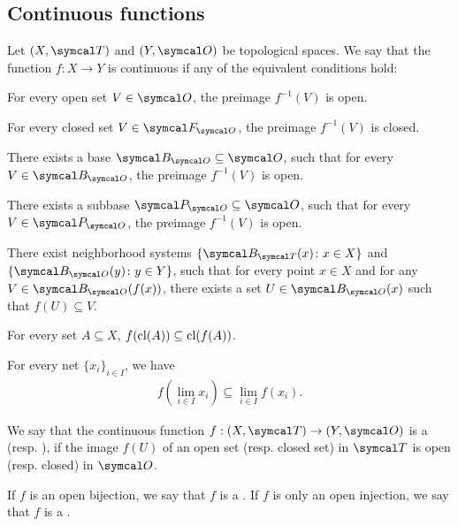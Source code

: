 \subsection{Continuous functions}\label{sec:continuous_functions}

\begin{definition}\label{def:continuous_function}
  Let \( (X, \Cal{T}) \) and \( (Y, \Cal{O}) \) be topological spaces. We say that the function \( f: X \to Y \) is continuous if any of the equivalent conditions hold:
  \begin{defenum}
    \item\label{def:continuous_function/direct} For every open set \( V \in \Cal{O} \), the preimage \( f^{-1}(V) \) is open.
    \item\label{def:continuous_function/closed} For every closed set \( V \in \Cal{F}_{\Cal{O}} \), the preimage \( f^{-1}(V) \) is closed.
    \item\label{def:continuous_function/base} There exists a base \( \Cal{B}_{\Cal{O}} \subseteq \Cal{O} \), such that for every \( V \in \Cal{B}_{\Cal{O}} \), the preimage \( f^{-1}(V) \) is open.
    \item\label{def:continuous_function/subbase} There exists a subbase \( \Cal{P}_{\Cal{O}} \subseteq \Cal{O} \), such that for every \( V \in \Cal{P}_{\Cal{O}} \), the preimage \( f^{-1}(V) \) is open.
    \item\label{def:continuous_function/local_base} There exist neighborhood systems \( \{ \Cal{B}_{\Cal{T}}(x) \colon x \in X \} \) and \( \{ \Cal{B}_{\Cal{O}}(y) \colon y \in Y \} \), such that for every point \( x \in X \) and for any \( V \in \Cal{B}_{\Cal{O}}(f(x)) \), there exists a set \( U \in \Cal{B}_{\Cal{O}}(x) \) such that \( f(U) \subseteq V \).
    \item\label{def:continuous_function/closure} For every set \( A \subseteq X \), \( f(\operatorname{cl}(A)) \subseteq \operatorname{cl}(f(A)) \).
    \item\label{def:continuous_function/limits} For every net \( \{ x_i \}_{i \in I} \), we have
    \begin{align*}
      f\left(\lim_{i \in I} x_i \right) \subseteq \lim_{i \in I} f(x_i).
    \end{align*}
  \end{defenum}
\end{definition}

\begin{definition}\label{def:homeomorphism}
  We say that the continuous function \( f: (X, \Cal{T}) \to (Y, \Cal{O}) \) is a  (resp. ), if the image \( f(U) \) of an open set (resp. closed set) in \( \Cal{T} \) is open (resp. closed) in \( \Cal{O} \).

  If \( f \) is an open bijection, we say that \( f \) is a . If \( f \) is only an open injection, we say that \( f \) is a .
\end{definition}
